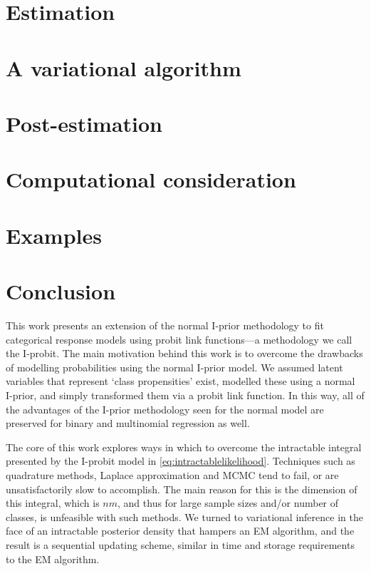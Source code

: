 \documentclass[a4paper,showframe,11pt]{report}
\begin{document}
\section{Estimation}


\section{A variational algorithm}\label{sec:iprobitvar}
%

\section{Post-estimation}
%

\section{Computational consideration}
%

\section{Examples}
\label{sec:iprobiteg}
%

\section{Conclusion}

This work presents an extension of the normal I-prior methodology to fit categorical response models using probit link functions---a methodology we call the I-probit.
The main motivation behind this work is to overcome the drawbacks of modelling probabilities using the normal I-prior model.
We assumed latent variables that represent `class propensities' exist, modelled these using a normal I-prior, and simply transformed them via a probit link function.
In this way, all of the advantages of the I-prior methodology seen for the normal model are preserved for binary and multinomial regression as well.

The core of this work explores ways in which to overcome the intractable integral presented by the I-probit model in \cref{eq:intractablelikelihood}.
Techniques such as quadrature methods, Laplace approximation and MCMC tend to fail, or are unsatisfactorily slow to accomplish.
The main reason for this is the dimension of this integral, which is $nm$, and thus for large sample sizes and/or number of classes, is unfeasible with such methods.
We turned to variational inference in the face of an intractable posterior density that hampers an EM algorithm, and the result is a sequential updating scheme, similar in time and storage requirements to the EM algorithm.
\end{document}

